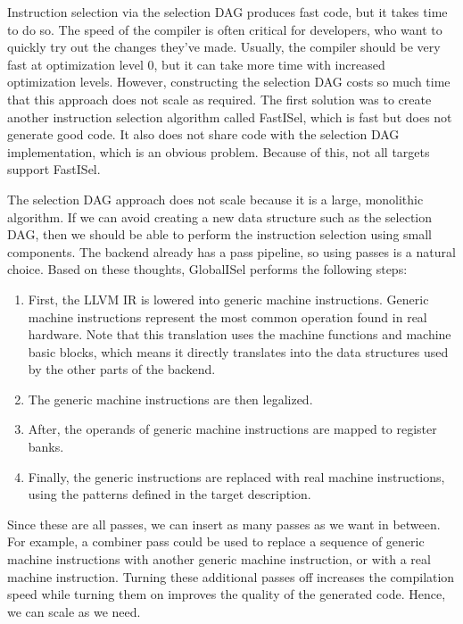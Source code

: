 
Instruction selection via the selection DAG produces fast code, but it takes time to do so. The speed of the compiler is often critical for developers, who want to quickly try out the changes they’ve made.
Usually, the compiler should be very fast at optimization level 0, but it can take more time with increased optimization levels. However, constructing the selection DAG costs so much time that this approach does not scale as required. The first solution was to create another instruction selection algorithm called FastISel, which is fast but does not generate good code. It also does not share code with the selection DAG implementation, which is an obvious problem. Because of this, not all targets support FastISel.

The selection DAG approach does not scale because it is a large, monolithic algorithm. If we can avoid creating a new data structure such as the selection DAG, then we should be able to perform the instruction selection using small components. The backend already has a pass pipeline, so using passes is a natural choice. Based on these thoughts, GlobalISel performs the following steps:

\begin{enumerate}
\item
First, the LLVM IR is lowered into generic machine instructions. Generic machine instructions represent the most common operation found in real hardware. Note that this translation uses the machine functions and machine basic blocks, which means it directly translates into the data structures used by the other parts of the backend.

\item
The generic machine instructions are then legalized.

\item
After, the operands of generic machine instructions are mapped to register banks.

\item
Finally, the generic instructions are replaced with real machine instructions, using the patterns defined in the target description.
\end{enumerate}

Since these are all passes, we can insert as many passes as we want in between. For example, a combiner pass could be used to replace a sequence of generic machine instructions with another generic machine instruction, or with a real machine instruction. Turning these additional passes off increases the compilation speed while turning them on improves the quality of the generated code. Hence, we can scale as we need.

